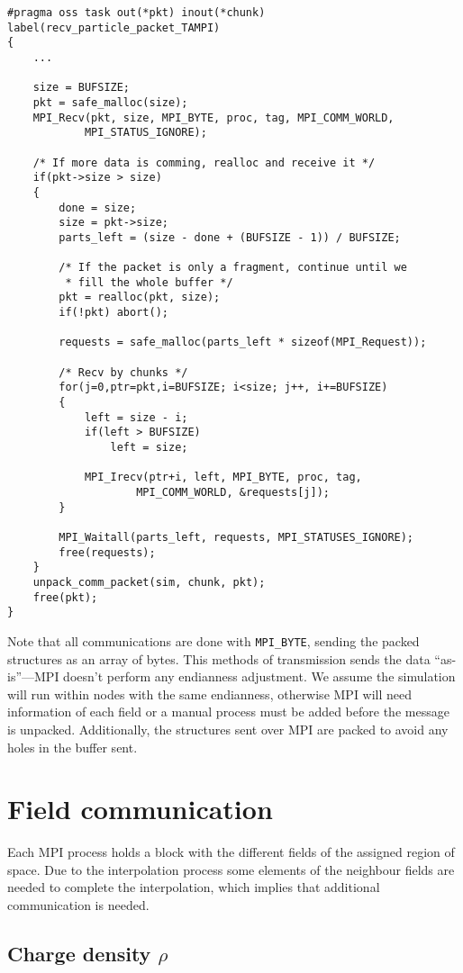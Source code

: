 \begin{lstlisting}
#pragma oss task out(*pkt) inout(*chunk) label(recv_particle_packet_TAMPI)
{
	...

	size = BUFSIZE;
	pkt = safe_malloc(size);
	MPI_Recv(pkt, size, MPI_BYTE, proc, tag, MPI_COMM_WORLD,
			MPI_STATUS_IGNORE);

	/* If more data is comming, realloc and receive it */
	if(pkt->size > size)
	{
		done = size;
		size = pkt->size;
		parts_left = (size - done + (BUFSIZE - 1)) / BUFSIZE;

		/* If the packet is only a fragment, continue until we
		 * fill the whole buffer */
		pkt = realloc(pkt, size);
		if(!pkt) abort();

		requests = safe_malloc(parts_left * sizeof(MPI_Request));

		/* Recv by chunks */
		for(j=0,ptr=pkt,i=BUFSIZE; i<size; j++, i+=BUFSIZE)
		{
			left = size - i;
			if(left > BUFSIZE)
				left = size;

			MPI_Irecv(ptr+i, left, MPI_BYTE, proc, tag,
					MPI_COMM_WORLD, &requests[j]);
		}

		MPI_Waitall(parts_left, requests, MPI_STATUSES_IGNORE);
		free(requests);
	}
	unpack_comm_packet(sim, chunk, pkt);
	free(pkt);
}
\end{lstlisting}

Note that all communications are done with \texttt{MPI\_BYTE}, sending the 
packed structures as an array of bytes. This methods of transmission sends the 
data ``as-is''---MPI doesn't perform any endianness adjustment. We assume the 
simulation will run within nodes with the same endianness, otherwise MPI will 
need information of each field or a manual process must be added before the 
message is unpacked. Additionally, the structures sent over MPI are packed to 
avoid any holes in the buffer sent.

\section{Field communication}

Each MPI process holds a block with the different fields of the assigned region 
of space. Due to the interpolation process some elements of the neighbour fields 
are needed to complete the interpolation, which implies that additional 
communication is needed.

\subsection{Charge density $\rho$}

